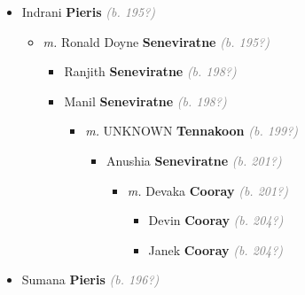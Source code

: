 \documentclass[10pt, openany]{book}
\begin{document}
\begin{itemize}
{\begin{itemize}
{\begin{itemize}
{\begin{itemize}
{ }
\item{Indrani \textbf{Pieris} \textcolor{gray}{\textit{(b. 195?)}}
\begin{itemize}
\item{\textit{m.} Ronald Doyne \textbf{Seneviratne} \textcolor{gray}{\textit{(b. 195?)}}   \label{couple:00001738:00001739} \begin{itemize}
\item{Ranjith \textbf{Seneviratne} \textcolor{gray}{\textit{(b. 198?)}}
 }
\item{Manil \textbf{Seneviratne} \textcolor{gray}{\textit{(b. 198?)}}
\begin{itemize}
\item{\textit{m.} UNKNOWN \textbf{Tennakoon} \textcolor{gray}{\textit{(b. 199?)}}   \label{couple:00001741:00001742} \begin{itemize}
\item{Anushia \textbf{Seneviratne} \textcolor{gray}{\textit{(b. 201?)}}
\begin{itemize}
\item{\textit{m.} Devaka \textbf{Cooray} \textcolor{gray}{\textit{(b. 201?)}}   \label{couple:00001743:00001744} \begin{itemize}
\item{Devin \textbf{Cooray} \textcolor{gray}{\textit{(b. 204?)}}
 }
\item{Janek \textbf{Cooray} \textcolor{gray}{\textit{(b. 204?)}}
 }
\end{itemize}}
\end{itemize}
 }
\end{itemize}}
\end{itemize}
 }
\end{itemize}}
\end{itemize}
 }
\item{Sumana \textbf{Pieris} \textcolor{gray}{\textit{(b. 196?)}}
 }
\end{itemize}}
\end{itemize}
   }
\end{itemize}}
\end{itemize}
  
\end{document}
